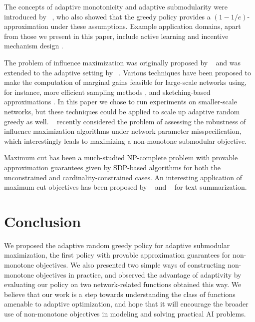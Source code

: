 \documentclass{article}
\newcommand{\citet}[1]{\citeauthor{#1}~\shortcite{#1}}
\begin{document}
The concepts of adaptive monotonicity and adaptive submodularity were introduced by \citet{golovin11}, who also showed that the greedy policy provides a $(1-1/e)$-approximation under these assumptions.
Example application domains, apart from those we present in this paper, include active learning \cite{chen14} and incentive mechanism design \cite{singla13}.

The problem of influence maximization was originally proposed by \citet{kempe03} and was extended to the adaptive setting by \citet{golovin11}.
Various techniques have been proposed to make the computation of marginal gains feasible for large-scale networks using, for instance, more efficient sampling methods \cite{ohsaka14}, and sketching-based approximations \cite{cohen14}.
In this paper we chose to run experiments on smaller-scale networks, but these techniques could be applied to scale up adaptive random greedy as well.
\citet{he14} recently considered the problem of assessing the robustness of influence maximization algorithms under network parameter misspecification, which interestingly leads to maximizing a non-monotone submodular objective.

Maximum cut has been a much-studied NP-complete problem with provable approximation guarantees given by SDP-based algorithms for both the unconstrained \cite{goemans95} and cardinality-constrained \cite{feige01} cases.
An interesting application of maximum cut objectives has been proposed by \citet{lin10} and \citet{lin11} for text summarization.

\section{Conclusion}
We proposed the adaptive random greedy policy for adaptive submodular maximization, the first policy with provable approximation guarantees for non-monotone objectives.
We also presented two simple ways of constructing non-monotone objectives in practice, and observed the advantage of adaptivity by evaluating our policy on two network-related functions obtained this way.
We believe that our work is a step towards understanding the class of functions amenable to adaptive optimization, and hope that it will encourage the broader use of non-monotone objectives in modeling and solving practical AI problems.




\iftoggle{short}
{}
{
\clearpage
\onecolumn
\appendix
\setcounter{lemma}{0}
\setcounter{theorem}{0}

}
\end{document}
